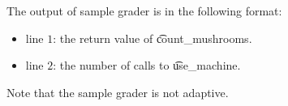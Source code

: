 The output of sample grader is in the following format:
\begin{itemize}
\item line $1$: the return value of \t{count\_mushrooms}.
\item line $2$: the number of calls to \t{use\_machine}.
\end{itemize}

Note that the sample grader is not adaptive.
